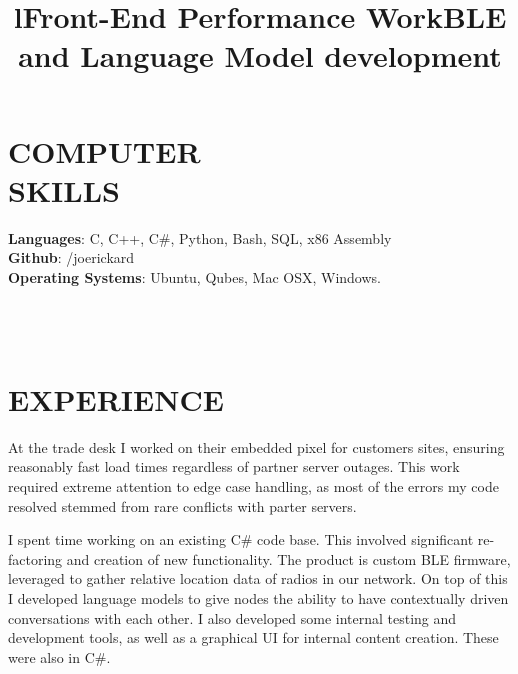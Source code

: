 \documentclass[margin]{res}
\begin{document}
\begin{resume}
\section{COMPUTER\\SKILLS}

\textbf{Languages}: C, C++, C\#, Python, Bash, SQL, x86 Assembly
\\
\textbf{Github}: /joerickard
\\
\textbf{Operating Systems}: 
Ubuntu, Qubes, Mac OSX, Windows.

\begin{format}
\title{l}\\
\\
\body
\end{format}
\section{EXPERIENCE}

\title{\textbf{Front-End Performance Work}}
\begin{position}
At the trade desk I worked on their embedded pixel for customers sites, ensuring reasonably fast load times regardless of partner server outages. This work required extreme attention to edge case handling, as most of the errors my code resolved stemmed from rare conflicts with parter servers.
\end{position}

\title{\textbf{BLE and Language Model development}}
\begin{position}
I spent time working on an existing C\# code base. This involved significant re-factoring and creation of new functionality. The product is custom BLE firmware, leveraged to gather relative location data of radios in our network. On top of this I developed language models to give nodes the ability to have contextually driven conversations with each other. I also developed some internal testing and development tools, as well as a graphical UI for internal content creation. These were also in C\#.
\end{position}


\end{resume}
\end{document}
